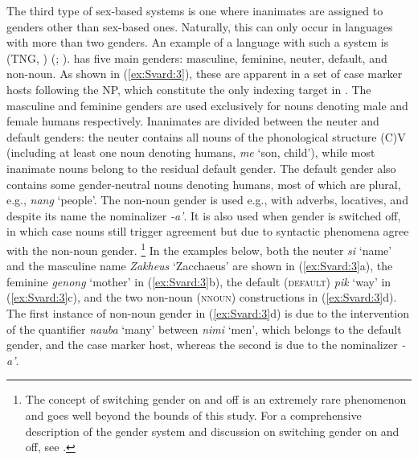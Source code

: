 \documentclass[output=collectionpaper]{langsci/langscibook}
\begin{document}
The third type of sex-based systems is one where inanimates are assigned to genders other than sex-based ones. Naturally, this can only occur in languages with more than two genders. An example of a language with such a system is  (TNG, ) (\citealt{Svaerd2013}; \citealt{Waelchli2018}).  has five main genders: masculine, feminine, neuter, default, and non-noun. As shown in (\ref{ex:Svard:3}), these are apparent in a set of case marker hosts following the NP, which constitute the only indexing target in . The masculine and feminine genders are used exclusively for nouns denoting male and female humans respectively. Inanimates are divided between the neuter and default genders: the neuter contains all nouns of the phonological structure (C)V (including at least one noun denoting humans, \textit{me} `son, child'), while most inanimate nouns belong to the residual default gender. The default gender also contains some gender-neutral nouns denoting humans, most of which are plural, e.g., \textit{nang} `people'. The non-noun gender is used e.g., with adverbs, locatives, and despite its name the nominalizer \textit{-a'}. It is also used when gender is switched off, in which case nouns still trigger agreement but due to syntactic phenomena agree with the non-noun gender.%
\footnote{The concept of switching gender on and off is an extremely rare phenomenon and goes well beyond the bounds of this study. For a comprehensive description of the  gender system and discussion on switching gender on and off, see \citet{Waelchli2018}.} %
In the examples below, both the neuter \textit{si} `name' and the masculine name \textit{Zakheus} `Zacchaeus' are shown in (\ref{ex:Svard:3}a), the feminine \textit{genong} `mother' in (\ref{ex:Svard:3}b), the default (\textsc{default)} \textit{pik} `way' in (\ref{ex:Svard:3}c), and the two non-noun (\textsc{nnoun}) constructions in (\ref{ex:Svard:3}d). The first instance of non-noun gender in (\ref{ex:Svard:3}d) is due to the intervention of the quantifier \textit{nauba} `many' between \textit{nimi} `men', which belongs to the default gender, and the case marker host, whereas the second is due to the nominalizer \textit{-a'}.
\end{document}
